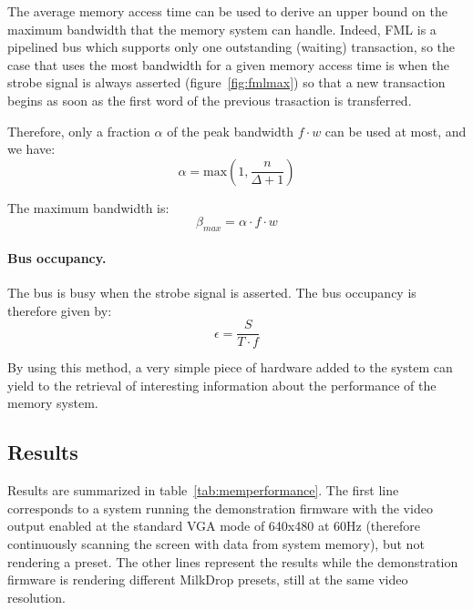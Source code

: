 \documentclass[a4paper,11pt]{kthesis}
\begin{document}
The average memory access time can be used to derive an upper bound on the maximum bandwidth that the memory system can handle. Indeed, FML is a pipelined bus which supports only one outstanding (waiting) transaction, so the case that uses the most bandwidth for a given memory access time is when the strobe signal is always asserted (figure~\ref{fig:fmlmax}) so that a new transaction begins as soon as the first word of the previous trasaction is transferred.

Therefore, only a fraction $\alpha$ of the peak bandwidth $f \cdot w$ can be used at most, and we have:
\begin{equation}
\alpha = \textrm{max}(1, \frac{n}{\Delta+1})
\end{equation}

The maximum bandwidth is:
\begin{equation}
\beta_{max} = \alpha \cdot f \cdot w
\end{equation}

\paragraph{Bus occupancy.} The bus is busy when the strobe signal is asserted. The bus occupancy is therefore given by:
\begin{equation}
\epsilon = \frac{S}{T \cdot f}
\end{equation}

By using this method, a very simple piece of hardware added to the system can yield to the retrieval of interesting information about the performance of the memory system.

\subsection{Results}
Results are summarized in table~\ref{tab:memperformance}. The first line corresponds to a system running the demonstration firmware with the video output enabled at the standard VGA mode of 640x480 at 60Hz (therefore continuously scanning the screen with data from system memory), but not rendering a preset. The other lines represent the results while the demonstration firmware is rendering different MilkDrop presets, still at the same video resolution.
\end{document}
